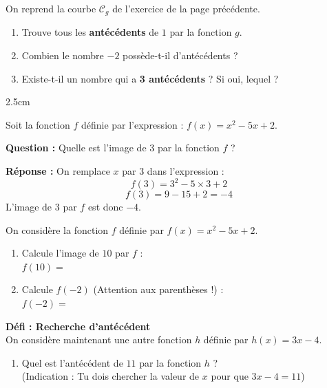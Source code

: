 \documentclass[a4paper]{book}
\begin{document}
    \begin{exercice}
        On reprend la courbe $\mathcal{C}_g$ de l'exercice de la page précédente.
        \begin{enumerate}
            \item Trouve tous les \textbf{antécédents} de $1$ par la fonction $g$.
            \item Combien le nombre $-2$ possède-t-il d'antécédents ?
            \item Existe-t-il un nombre qui a \textbf{3 antécédents} ? Si oui, lequel ?
        \end{enumerate}
        \begin{ZoneReponse}{2.5cm}\end{ZoneReponse}
    \end{exercice}


    \begin{methode}
        Soit la fonction $f$ définie par l'expression : $f(x) = x^2 - 5x + 2$.
        
        \textbf{Question :} Quelle est l'image de $3$ par la fonction $f$ ?
        
        \textbf{Réponse :} On remplace $x$ par $3$ dans l'expression :
        \[ f(3) = 3^2 - 5 \times 3 + 2 \]
        \[ f(3) = 9 - 15 + 2 = -4 \]
        L'image de $3$ par $f$ est donc $-4$.
    \end{methode}
    
    
    \begin{exercice}
        On considère la fonction $f$ définie par $f(x) = x^2 - 5x + 2$.
        \begin{enumerate}
            \item Calcule l'image de $10$ par $f$ : \\
            $f(10) = $ \dotfill
            
            \item Calcule $f(-2)$ (Attention aux parenthèses !) : \\
            $f(-2) = $ \dotfill
        \end{enumerate}

        \medskip
        \textbf{Défi : Recherche d'antécédent} \\
        On considère maintenant une autre fonction $h$ définie par $h(x) = 3x - 4$.
        \begin{enumerate}[resume]
            \item Quel est l'antécédent de $11$ par la fonction $h$ ? \\
            (Indication : Tu dois chercher la valeur de $x$ pour que $3x - 4 = 11$) \\
        \end{enumerate}
    \end{exercice}
\end{document}
